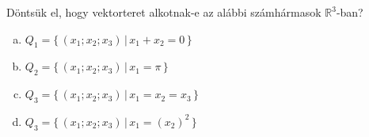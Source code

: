 \begin{exercise}{%
		Döntsük el, hogy vektorteret alkotnak-e az alábbi számhármasok
		$\mathbb R^3$-ban?
	}
	\newcommand{\setmap}[2]{\Big\{\, #1 \,\Big|\, #2 \,\Big\}}
	\begin{enumerate}[a)]
		\item $Q_1 = \setmap{(x_1; x_2; x_3)}{x_1 + x_2 = 0}$
		\item $Q_2 = \setmap{(x_1; x_2; x_3)}{x_1 = \pi}$
		\item $Q_3 = \setmap{(x_1; x_2; x_3)}{x_1 = x_2 = x_3}$
		\item $Q_3 = \setmap{(x_1; x_2; x_3)}{x_1 = (x_2)^2}$
	\end{enumerate}

\end{exercise}
